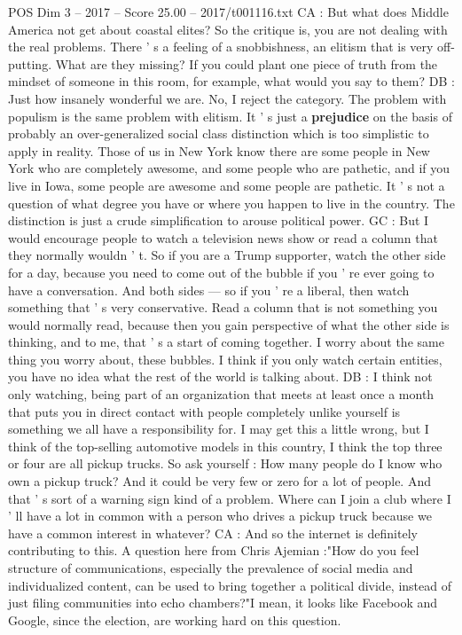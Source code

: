 \begin{textsample}{POS Dim 3 – 2017 – Score 25.00 – 2017/t001116.txt}
CA : But what does Middle America not get about coastal elites?
So the critique is, you are not dealing with the real problems.
There ' s a feeling of a snobbishness, an elitism that is very off-putting.
What are they missing?
If you could plant one piece of truth from the mindset of someone in this room, for example, what would you say to them?
DB : Just how insanely wonderful we are.
No, I reject the category.
The problem with populism is the same problem with elitism.
It ' s just a \textbf{prejudice} on the basis of probably an over-generalized social class distinction which is too simplistic to apply in reality.
Those of us in New York know there are some people in New York who are completely awesome, and some people who are pathetic, and if you live in Iowa, some people are awesome and some people are pathetic.
It ' s not a question of what degree you have or where you happen to live in the country.
The distinction is just a crude simplification to arouse political power.
GC : But I would encourage people to watch a television news show or read a column that they normally wouldn ' t.
So if you are a Trump supporter, watch the other side for a day, because you need to come out of the bubble if you ' re ever going to have a conversation.
And both sides — so if you ' re a liberal, then watch something that ' s very conservative.
Read a column that is not something you would normally read, because then you gain perspective of what the other side is thinking, and to me, that ' s a start of coming together.
I worry about the same thing you worry about, these bubbles.
I think if you only watch certain entities, you have no idea what the rest of the world is talking about.
DB : I think not only watching, being part of an organization that meets at least once a month that puts you in direct contact with people completely unlike yourself is something we all have a responsibility for.
I may get this a little wrong, but I think of the top-selling automotive models in this country, I think the top three or four are all pickup trucks.
So ask yourself : How many people do I know who own a pickup truck?
And it could be very few or zero for a lot of people.
And that ' s sort of a warning sign kind of a problem.
Where can I join a club where I ' ll have a lot in common with a person who drives a pickup truck because we have a common interest in whatever?
CA : And so the internet is definitely contributing to this.
A question here from Chris Ajemian :"How do you feel structure of communications, especially the prevalence of social media and individualized content, can be used to bring together a political divide, instead of just filing communities into echo chambers?"I mean, it looks like Facebook and Google, since the election, are working hard on this question.

\end{textsample}

